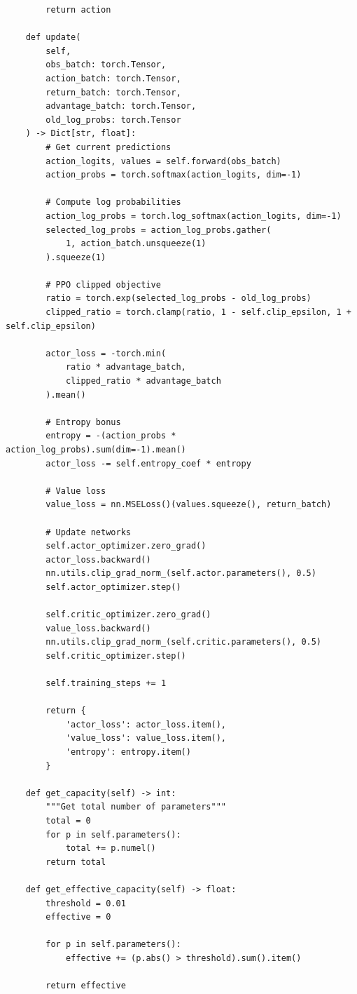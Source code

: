 \documentclass[10pt, letterpaper]{article}
\begin{document}
\begin{lstlisting}
        return action

    def update(
        self,
        obs_batch: torch.Tensor,
        action_batch: torch.Tensor,
        return_batch: torch.Tensor,
        advantage_batch: torch.Tensor,
        old_log_probs: torch.Tensor
    ) -> Dict[str, float]:
        # Get current predictions
        action_logits, values = self.forward(obs_batch)
        action_probs = torch.softmax(action_logits, dim=-1)

        # Compute log probabilities
        action_log_probs = torch.log_softmax(action_logits, dim=-1)
        selected_log_probs = action_log_probs.gather(
            1, action_batch.unsqueeze(1)
        ).squeeze(1)

        # PPO clipped objective
        ratio = torch.exp(selected_log_probs - old_log_probs)
        clipped_ratio = torch.clamp(ratio, 1 - self.clip_epsilon, 1 + self.clip_epsilon)

        actor_loss = -torch.min(
            ratio * advantage_batch,
            clipped_ratio * advantage_batch
        ).mean()

        # Entropy bonus
        entropy = -(action_probs * action_log_probs).sum(dim=-1).mean()
        actor_loss -= self.entropy_coef * entropy

        # Value loss
        value_loss = nn.MSELoss()(values.squeeze(), return_batch)

        # Update networks
        self.actor_optimizer.zero_grad()
        actor_loss.backward()
        nn.utils.clip_grad_norm_(self.actor.parameters(), 0.5)
        self.actor_optimizer.step()

        self.critic_optimizer.zero_grad()
        value_loss.backward()
        nn.utils.clip_grad_norm_(self.critic.parameters(), 0.5)
        self.critic_optimizer.step()

        self.training_steps += 1

        return {
            'actor_loss': actor_loss.item(),
            'value_loss': value_loss.item(),
            'entropy': entropy.item()
        }

    def get_capacity(self) -> int:
        """Get total number of parameters"""
        total = 0
        for p in self.parameters():
            total += p.numel()
        return total

    def get_effective_capacity(self) -> float:
        threshold = 0.01
        effective = 0

        for p in self.parameters():
            effective += (p.abs() > threshold).sum().item()

        return effective
\end{lstlisting}
\end{document}
